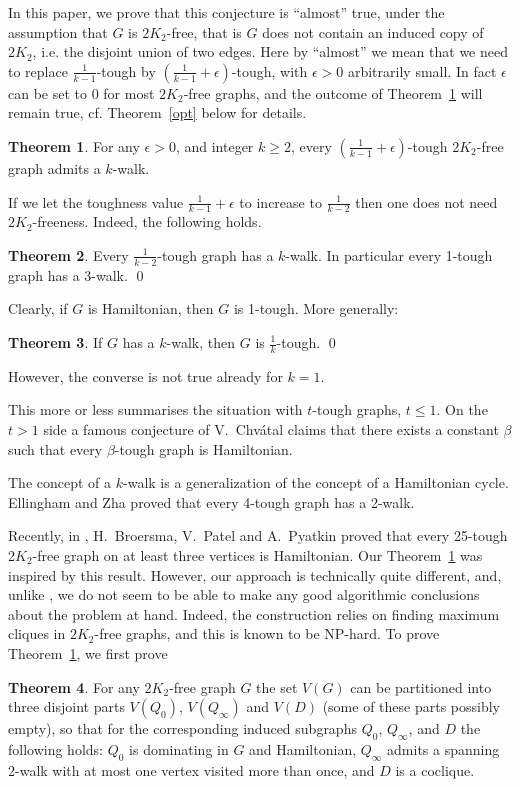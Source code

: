 \documentclass{amsart}
\theoremstyle{definition}
\newtheorem{theorem}{Theorem}
\begin{document}
In this paper, we prove that this conjecture is ``almost'' true, under the
assumption that $G$ is  $2K_2$-free, that is $G$ does not contain an induced
copy of $2K_2$, i.e. the disjoint union of two edges.  Here by ``almost'' we
mean that we need to replace $\frac{1}{k-1}$-tough by
$(\frac{1}{k-1}+\epsilon)$-tough, with $\epsilon>0$ arbitrarily small.  In fact
$\epsilon$ can be set to 0 for most $2K_2$-free graphs, and the outcome of
Theorem~\ref{thm2} will remain true, cf. Theorem~\ref{opt} below for details.
\begin{theorem}\label{thm2} 
For any $\epsilon>0$, and integer $k\ge2$, every
$(\frac{1}{k-1}+\epsilon)$-tough $2K_2$-free graph admits a $k$-walk.
\end{theorem}

If we let the toughness value $\frac{1}{k-1}+\epsilon$ to increase to 
$\frac{1}{k-2}$ then
one does not need $2K_2$-freeness. Indeed, the following holds.
\begin{theorem}\cite{jackson1990k}\label{cthm1}
Every $\frac{1}{k-2}$-tough graph has a $k$-walk. 
In particular every 1-tough graph has a 3-walk. \qed
\end{theorem}
Clearly, if $G$ is
Hamiltonian, then $G$ is 1-tough.  More generally:
\begin{theorem}\cite{jackson1990k}\label{add}
If $G$ has a $k$-walk, then $G$ is $\frac{1}{k}$-tough. \qed
\end{theorem} 
However, the converse is not true already for $k=1$.  

This more or less summarises the situation with $t$-tough graphs, $t\leq 1$.
On the $t>1$ side 
a famous conjecture of V.~Chv\'{a}tal \cite{chvatal1973tough} claims
that there exists a constant $\beta$ such that every
$\beta$-tough graph is Hamiltonian.  

The concept of a $k$-walk is a generalization of the concept of a Hamiltonian cycle.
Ellingham and Zha \cite{ellingham2000toughness} proved that
every 4-tough graph has a 2-walk.

Recently, in \cite{broersma2014toughness}, H.~Broersma, V.~Patel and A.~Pyatkin proved that 
every 25-tough 2$K_2$-free graph on at least three vertices is Hamiltonian.
Our Theorem~\ref{thm2} was inspired by this result.  
However, our
approach is technically quite different, and, unlike \cite{broersma2014toughness}, we do not seem to be
able to make any good algorithmic conclusions about the problem at hand.
Indeed, the construction relies on finding maximum cliques in
$2K_2$-free graphs, and this is known to be NP-hard. 
To prove Theorem~\ref{thm2}, we first prove
\begin{theorem}\label{thm1}
For any $2K_2$-free graph $G$ the set $V(G)$ 
can be partitioned into three disjoint parts $V(Q_0)$, $V(Q_{\infty})$ and $V(D)$ (some of these parts possibly empty), so that for the corresponding induced subgraphs
$Q_0$, $Q_\infty$, and $D$ the following holds: $Q_0$ is dominating in $G$ and Hamiltonian, 
$Q_{\infty}$ admits a spanning 2-walk with at most one vertex visited more than once, 
and $D$ is a coclique.
\end{theorem}
\end{document}
